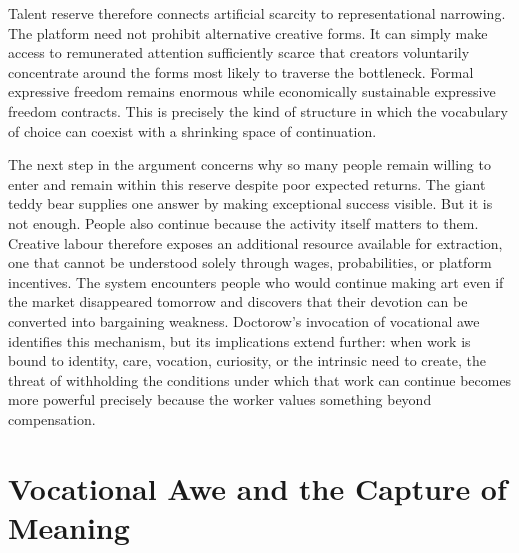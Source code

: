 \documentclass[11pt]{article}
\begin{document}
Talent reserve therefore connects artificial scarcity to representational narrowing. The platform need not prohibit alternative creative forms. It can simply make access to remunerated attention sufficiently scarce that creators voluntarily concentrate around the forms most likely to traverse the bottleneck. Formal expressive freedom remains enormous while economically sustainable expressive freedom contracts. This is precisely the kind of structure in which the vocabulary of choice can coexist with a shrinking space of continuation.

The next step in the argument concerns why so many people remain willing to enter and remain within this reserve despite poor expected returns. The giant teddy bear supplies one answer by making exceptional success visible. But it is not enough. People also continue because the activity itself matters to them. Creative labour therefore exposes an additional resource available for extraction, one that cannot be understood solely through wages, probabilities, or platform incentives. The system encounters people who would continue making art even if the market disappeared tomorrow and discovers that their devotion can be converted into bargaining weakness. Doctorow's invocation of vocational awe identifies this mechanism, but its implications extend further: when work is bound to identity, care, vocation, curiosity, or the intrinsic need to create, the threat of withholding the conditions under which that work can continue becomes more powerful precisely because the worker values something beyond compensation.

\section{Vocational Awe and the Capture of Meaning}
\end{document}
